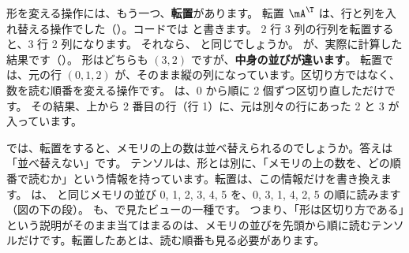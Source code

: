 形を変える操作には、もう一つ、\textbf{転置}があります。
転置 $\mA^\T$ は、行と列を入れ替える操作でした（）。コードでは  と書きます。
2 行 3 列の行列を転置すると、3 行 2 列になります。
それなら、 と同じでしょうか。
が、実際に計算した結果です（）。
形はどちらも $(3,2)$ ですが、\textbf{中身の並びが違います}。
転置では、元の行 $(0,1,2)$ が、そのまま縦の列になっています。区切り方ではなく、数を読む順番を変える操作です。
 は、0 から順に 2 個ずつ区切り直しただけです。
その結果、上から 2 番目の行（行 1）に、元は別々の行にあった 2 と 3 が入っています。

では、転置をすると、メモリの上の数は並べ替えられるのでしょうか。答えは「並べ替えない」です。
テンソルは、形とは別に、「メモリの上の数を、どの順番で読むか」という情報を持っています。転置は、この情報だけを書き換えます。
 は、 と同じメモリの並び 0, 1, 2, 3, 4, 5 を、0, 3, 1, 4, 2, 5 の順に読みます（図の下の段）。
 も、で見たビューの一種です。
つまり、「形は区切り方である」という説明がそのまま当てはまるのは、メモリの並びを先頭から順に読むテンソルだけです。転置したあとは、読む順番も見る必要があります。

